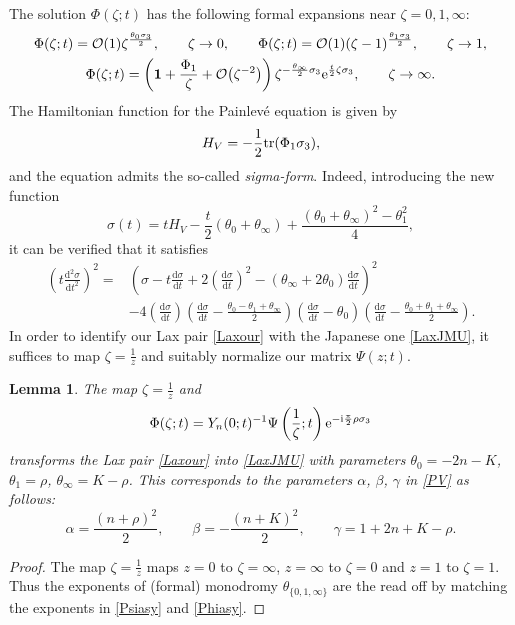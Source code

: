 \documentclass[pdftex]{sigma}
\numberwithin{equation}{section}
\newtheorem{Lemma}[Theorem]{Lemma}
\theoremstyle{definition}
\def\tr{{\rm tr}}
\def\le{\left}
\def\ri{\right}
\def \d{{\mathrm d}}
\def\nn{\nonumber}
\def\be{\begin{equation}}
\def\ee{\end{equation}}
\def \1{\mathbf 1}
\def\s{\sigma}
\begin{document}
 The solution $\Phi(\zeta;t)$ has the following formal expansions near $\zeta=0, 1, \infty$:
 \begin{gather}
 \Phi(\zeta;t) = \mathcal O(1) \zeta^\frac {\theta_0 \s_3}2, \qquad \zeta \to 0,\qquad
 \Phi(\zeta;t) = \mathcal O(1) (\zeta-1)^\frac {\theta_1 \s_3}2, \qquad \zeta \to 1,\nn\\
 \Phi(\zeta;t) =\le(\1 + \frac {\Phi_1}\zeta + \mathcal O\bigl(\zeta^{-2}\bigr)\ri) \zeta ^{-\frac {\theta_\infty}2 \s_3}{\rm e}^{\frac t 2 \zeta\s_3}, \qquad \zeta \to \infty.
 \label{Phiasy}
\end{gather}
 The Hamiltonian function for the Painlev\'e equation is given by
 \be
 \label{HamJMUPV}
 H_V = -\frac 1 2 \tr( \Phi_1\s_3),
 \ee
 and the equation admits the so-called {\it sigma-form}. Indeed, introducing the new function
 \[
 \s(t) = t H_V - \frac t 2 (\theta_0 + \theta_\infty) + \frac { (\theta_0 + \theta_\infty)^2 - \theta_1^2}4,
 \]
 it can be verified that it satisfies \cite[formula (C.45)]{JMU2}
 \begin{align*}%
 \le(t \frac {\d^2 \s}{\d t^2}\ri)^2 ={}& \le(
 \s - t\frac {\d \s}{\d t} + 2\le(\frac {\d \s}{\d t}\ri)^2 - (\theta_\infty + 2\theta_0) \frac {\d \s}{\d t}
 \ri)^2 \\
 &- 4 \le(\frac {\d \s}{\d t}\ri)
 \le(\frac {\d \s}{\d t} - \frac { \theta_0 -\theta_1 + \theta_\infty}2 \ri)
 \le( \frac {\d \s}{\d t} - \theta_0 \ri)
 \le(\frac {\d \s}{\d t} - \frac { \theta_0 + \theta_1 + \theta_\infty}2 \ri).
 \end{align*}
In order to identify our Lax pair \eqref{Laxour} with the Japanese one \eqref{LaxJMU}, it suffices to map $\zeta = \frac 1 z$ and suitably normalize our matrix $\Psi(z;t)$.
\begin{Lemma}
The map $\zeta = \frac 1 z$ and
\[
\Phi(\zeta;t) = Y_n(0;t)^{-1}\Psi\le(\frac 1 \zeta;t\ri){\rm e}^{-{\rm i}\frac{\pi}2 { {\rho}} \s_3}
\]
transforms the Lax pair \eqref{Laxour} into \eqref{LaxJMU} with parameters
$
\theta_0 = - 2n - { {K}}$, $
\theta_1 = { {\rho}}$, $
\theta_\infty= { {K}}-{ {\rho}} $.
This corresponds to the parameters $\alpha$, $\beta$, $\gamma$ in \eqref{PV} as follows:
\[
\alpha = \frac {(n+ { {\rho}})^2}2,\qquad
\beta = -\frac {(n + { {K}})^2} 2,\qquad
\gamma = 1+2n + { {K}} - { {\rho}}.
\]
\end{Lemma}
\begin{proof}
The map $\zeta=\frac 1 z$ maps $z=0$ to $\zeta=\infty$, $z=\infty$ to $\zeta=0$ and $z=1 $ to $\zeta=1$. Thus the exponents of (formal) monodromy $\theta_{\{0,1,\infty\}}$ are the read off by matching the exponents in \eqref{Psiasy} and \eqref{Phiasy}.
\end{proof}
\end{document}
